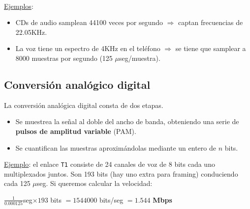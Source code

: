\documentclass[]{article}
\begin{document}
~\newline
{}

\underline{Ejemplos}:
\begin{itemize}
    \item CDs de audio samplean 44100 veces por segundo $\Rightarrow$ captan frecuencias de 22.05KHz.
    \item La voz tiene un espectro de 4KHz en el teléfono $\Rightarrow$ se tiene que samplear a 8000 muestras por segundo (125 $\mu$seg/muestra).
\end{itemize}

\subsection{Conversión analógico digital}



La conversión analógica digital consta de dos etapas.
\begin{itemize}
    \item Se muestrea la señal al doble del ancho de banda, obteniendo una serie de \textbf{pulsos de amplitud variable} (PAM).
    \item Se cuantifican las muestras aproximándolas mediante un entero de $n$ bits.
\end{itemize}

\underline{Ejemplo}: el enlace \texttt{T1} consiste de 24 canales de voz de 8 bits cada uno multiplexados juntos. Son 193 bits (hay uno extra para framing) conduciendo cada 125 $\mu$seg. Si queremos calcular la velocidad:
\begin{center}
    $\frac{1}{0.000125}$seg$ \times 193$ bits $= 1544000$ bits/seg $=1.544$ \textbf{Mbps}
\end{center}
\end{document}
